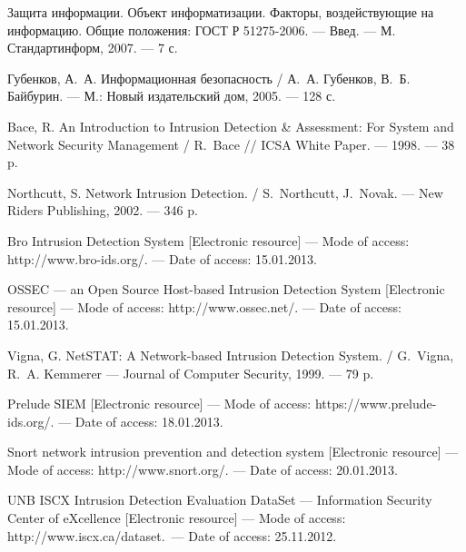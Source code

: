 \begin{thebibliography}{99}
    
    Защита информации. Объект информатизации. Факторы, воздействующие
    на информацию. Общие положения: ГОСТ Р 51275-2006. --- Введ. --- М.~
    Стандартинформ, 2007. --- 7 с.
    
    Губенков, А.~А. Информационная безопасность / А.~А. Губенков, В.~Б. Байбурин. ---
    М.: Новый издательский дом, 2005. --- 128 с.
    
    Bace, R. An Introduction to Intrusion Detection \& Assessment: For System and Network 
    Security Management / R.~Bace // ICSA White Paper. --- 1998. --- 38 p.
    
    \bibitem{}
	Northcutt, S. Network Intrusion Detection. / S.~Northcutt, J.~Novak. --- 
	New Riders Publishing, 2002. --- 346 p.
	
	Bro Intrusion Detection System [Electronic resource] --- Mode of access: 
	http://www.bro-ids.org/. --- Date of access: 15.01.2013.
	
	OSSEC --- an Open Source Host-based Intrusion Detection System [Electronic resource] 
	--- Mode of access: http://www.ossec.net/. --- Date of access: 15.01.2013.
	
	Vigna, G. NetSTAT: A Network-based Intrusion Detection System. / G.~Vigna, 
	R.~A. Kemmerer --- Journal of Computer Security, 1999. --- 79 p.
	
	Prelude SIEM [Electronic resource]	--- Mode of access: 
	https://www.prelude-ids.org/. --- Date of access: 18.01.2013.
	
	Snort network intrusion prevention and detection system [Electronic resource] ---
	Mode of access: http://www.snort.org/. --- Date of access: 20.01.2013.
	
	UNB ISCX Intrusion Detection Evaluation DataSet --- Information Security Center of eXcellence
	[Electronic resource] --- Mode of access: http://www.iscx.ca/dataset.~---	Date of access: 25.11.2012. 
	
\end{thebibliography}